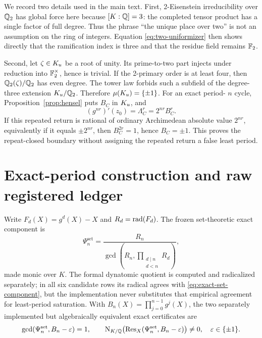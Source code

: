 \documentclass[11pt]{article}
\theoremstyle{definition}
\theoremstyle{remark}
\begin{document}
We record two details used in the main text.  First, 2-Eisenstein
irreducibility over \(\mathbb{Q}_2\) has global force here because \([K:\mathbb{Q}]=3\):
the completed tensor product has a single factor of full degree.  Thus the
phrase ``the unique place over two'' is not an assumption on the ring of
integers.  Equation \eqref{eq:two-uniformizer} then shows directly that the
ramification index is three and that the residue field remains \(\mathbb{F}_2\).

Second, let \(\zeta\in K_u\) be a root of unity.  Its prime-to-two part
injects under reduction into \(\mathbb{F}_2^\times\), hence is trivial.  If the
2-primary order is at least four, then \(\mathbb{Q}_2(\zeta)/\mathbb{Q}_2\) has even
degree.  The tower law forbids such a subfield of the degree-three extension
\(K_u/\mathbb{Q}_2\).  Therefore \(\mu(K_u)=\{\pm1\}\).  For an exact period-
\(n\) cycle, Proposition~\ref{prop:hensel} puts \(B_C\) in \(K_u\), and
\[
  (g^{nr})'(z_0)=\Lambda_C^r=2^{nr}B_C^r.
\]
If this repeated return is rational of ordinary Archimedean absolute value
\(2^{nr}\), equivalently if it equals \(\pm2^{nr}\), then
\(B_C^{2r}=1\), hence \(B_C=\pm1\).  This proves the repeat-closed boundary
without assigning the repeated return a false least period.

\section{Exact-period construction and raw registered ledger}
\label{app:ledger}

Write \(F_d(X)=g^d(X)-X\) and \(R_d=\operatorname{rad}(F_d)\).  The frozen set-theoretic
exact component is
\begin{equation}
  \Psi_n^{\mathrm{set}}
  =\frac{R_n}{\gcd\!\left(R_n,
        \prod_{\substack{d\mid n\\d<n}}R_d\right)},
  \label{eq:exact-set-component}
\end{equation}
made monic over \(K\).  The formal dynatomic quotient is computed and
radicalized separately; in all six candidate rows its radical agrees with
\eqref{eq:exact-set-component}, but the implementation never substitutes
that empirical agreement for least-period saturation.  With
\(B_n(X)=\prod_{j=0}^{n-1}g^j(X)\), the two separately implemented but
algebraically equivalent exact certificates are
\begin{equation}
 \gcd(\Psi_n^{\mathrm{set}},B_n-\varepsilon)=1,
 \qquad
 \operatorname{N}_{K/\mathbb{Q}}\!\left(\operatorname{Res}_X(\Psi_n^{\mathrm{set}},B_n-\varepsilon)\right)
 \ne0,
 \quad \varepsilon\in\{\pm1\}.
 \label{eq:dual-certificates}
\end{equation}
\end{document}
